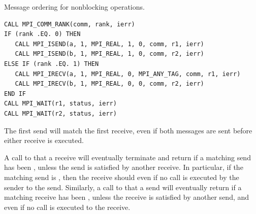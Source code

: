 \begin{example}
\label{pt2pt-exL}
%
%
Message ordering for nonblocking operations.
\begin{lstlisting}[language={[MPI]Fortran}]
CALL MPI_COMM_RANK(comm, rank, ierr)
IF (rank .EQ. 0) THEN
   CALL MPI_ISEND(a, 1, MPI_REAL, 1, 0, comm, r1, ierr)
   CALL MPI_ISEND(b, 1, MPI_REAL, 1, 0, comm, r2, ierr)
ELSE IF (rank .EQ. 1) THEN
   CALL MPI_IRECV(a, 1, MPI_REAL, 0, MPI_ANY_TAG, comm, r1, ierr)
   CALL MPI_IRECV(b, 1, MPI_REAL, 0, 0, comm, r2, ierr)
END IF
CALL MPI_WAIT(r1, status, ierr)
CALL MPI_WAIT(r2, status, ierr)
\end{lstlisting}
The first send will match the
first receive, even
if both messages are sent before either receive is executed.
\end{example}

A call to  that  a receive will eventually
terminate and return if a matching send has been , unless
the send is satisfied by another receive.  In particular, if the matching send
is
,
then the receive should  even if no call is executed by the
sender to  the send.  Similarly, a call to  that
 a send will eventually
return if a matching receive has been , unless
the receive is satisfied by another send, and even if no call is executed to
 the receive.


